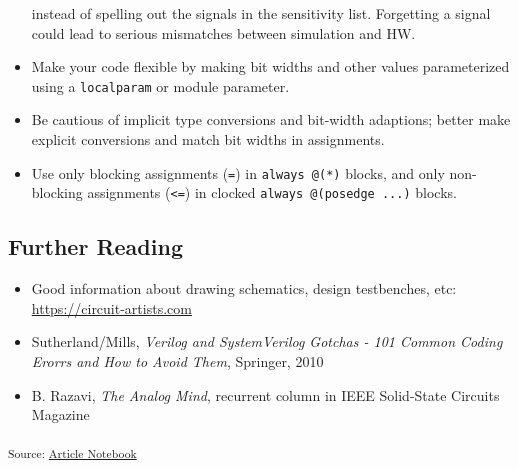 \documentclass[
  a4paper,
  DIV=11,
  numbers=noendperiod]{scrartcl}
\providecommand{\tightlist}{%
  \setlength{\itemsep}{0pt}\setlength{\parskip}{0pt}}\usepackage{longtable,booktabs,array}
\begin{document}
\begin{itemize}
  instead of spelling out the signals in the sensitivity list.
  Forgetting a signal could lead to serious mismatches between
  simulation and HW.
\item
  Make your code flexible by making bit widths and other values
  parameterized using a \texttt{localparam} or module parameter.
\item
  Be cautious of implicit type conversions and bit-width adaptions;
  better make explicit conversions and match bit widths in assignments.
\item
  Use only blocking assignments (\texttt{=}) in \texttt{always\ @(*)}
  blocks, and only non-blocking assignments (\texttt{\textless{}=}) in
  clocked \texttt{always\ @(posedge\ ...)} blocks.
\end{itemize}

\subsection{Further Reading}\label{further-reading}

\begin{itemize}
\tightlist
\item
  Good information about drawing schematics, design testbenches, etc:
  \url{https://circuit-artists.com}
\item
  Sutherland/Mills, \emph{Verilog and SystemVerilog Gotchas - 101 Common
  Coding Erorrs and How to Avoid Them}, Springer, 2010
\item
  B. Razavi, \emph{The Analog Mind}, recurrent column in IEEE
  Solid-State Circuits Magazine
\end{itemize}

\textsubscript{Source:
\href{https://iic-jku.github.io/analog-circuit-design/index.qmd.html}{Article
Notebook}}
\end{document}
